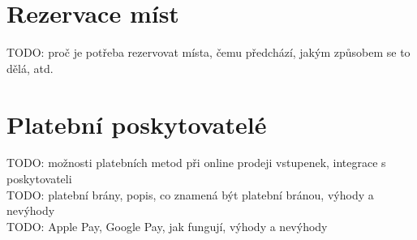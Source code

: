 \section{Rezervace míst}
TODO: proč je potřeba rezervovat místa, čemu předchází, jakým způsobem se to dělá, atd.

\section{Platební poskytovatelé}
TODO: možnosti platebních metod při online prodeji vstupenek, integrace s poskytovateli\\
TODO: platební brány, popis, co znamená být platební bránou, výhody a nevýhody\\
TODO: Apple Pay, Google Pay, jak fungují, výhody a nevýhody
